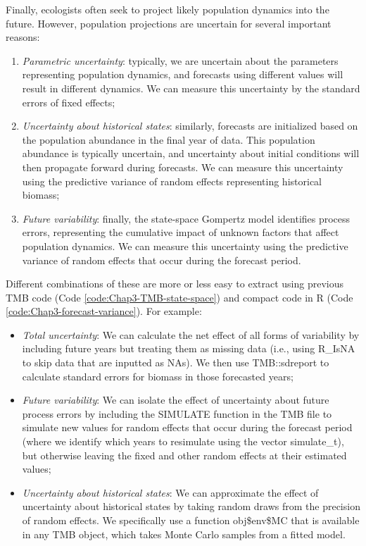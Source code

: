 Finally, ecologists often seek to project likely population dynamics into the future.  However, population projections are uncertain for several important reasons:
\begin{enumerate}
    \item \textit{Parametric uncertainty}: typically, we are uncertain about the parameters representing population dynamics, and forecasts using different values will result in different dynamics.  We can measure this uncertainty by the standard errors of fixed effects;

    \item \textit{Uncertainty about historical states}: similarly, forecasts are initialized based on the population abundance in the final year of data. This population abundance is typically uncertain, and uncertainty about initial conditions will then propagate forward during forecasts.  We can measure this uncertainty using the predictive variance of random effects representing historical biomass;

    \item \textit{Future variability}:  finally, the state-space Gompertz model identifies process errors, representing the cumulative impact of unknown factors that affect population dynamics. We can measure this uncertainty using the predictive variance of random effects that occur during the forecast period.
\end{enumerate}
Different combinations of these are more or less easy to extract using previous TMB code (Code \ref{code:Chap3-TMB-state-space}) and compact code in R (Code \ref{code:Chap3-forecast-variance}).  For example:
\begin{itemize}
    \item \textit{Total uncertainty}:  We can calculate the net effect of all forms of variability by including future years but treating them as missing data (i.e., using \colorbox{backblue}{R\_IsNA} to skip data that are inputted as NAs).  We then use \colorbox{backcolour}{TMB::sdreport} to calculate standard errors for biomass in those forecasted years;

    \item \textit{Future variability}:  We can isolate the effect of uncertainty about future process errors by including the \colorbox{backblue}{SIMULATE} function in the TMB file to simulate new values for random effects that occur during the forecast period (where we identify which years to resimulate using the vector \colorbox{backblue}{simulate\_t}), but otherwise leaving the fixed and other random effects at their estimated values;

    \item \textit{Uncertainty about historical states}:  We can approximate the effect of uncertainty about historical states by taking random draws from the precision of random effects.  We specifically use a function \colorbox{backcolour}{obj\$env\$MC} that is available in any TMB object, which takes Monte Carlo samples from a fitted model.     
\end{itemize}

